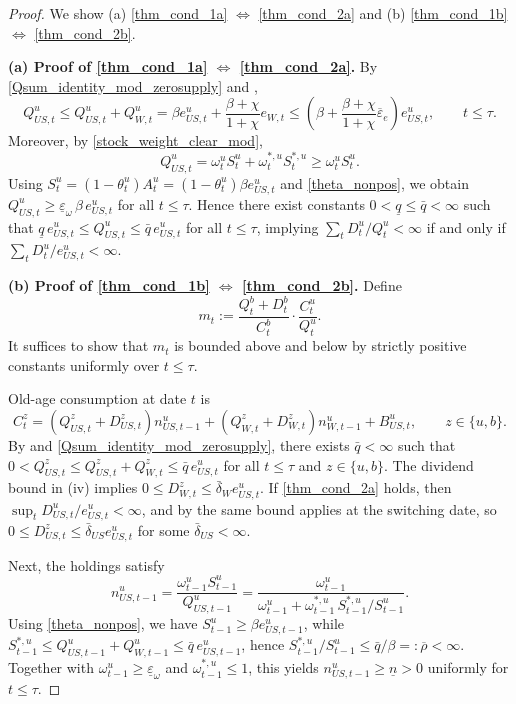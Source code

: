 \documentclass[12pt]{article}
\theoremstyle{plain}
\begin{document}
\begin{proof}
We show (a) \eqref{thm_cond_1a} $\Longleftrightarrow$ \eqref{thm_cond_2a} and (b) \eqref{thm_cond_1b}
$\Longleftrightarrow$ \eqref{thm_cond_2b}.

\medskip
\noindent\textbf{(a) Proof of \eqref{thm_cond_1a} $\Longleftrightarrow$ \eqref{thm_cond_2a}.}
By \eqref{Qsum_identity_mod_zerosupply} and ,
\[
Q_{US,t}^u \le Q_{US,t}^u+Q_{W,t}^u
=\beta e_{US,t}^u+\frac{\beta+\chi}{1+\chi}e_{W,t}
\le \left(\beta+\frac{\beta+\chi}{1+\chi}\overline\varepsilon_e\right)e_{US,t}^u,
\qquad t\le\tau.
\]
Moreover, by \eqref{stock_weight_clear_mod},
\[
Q_{US,t}^u=\omega_t^u S_t^u+\omega_t^{*,u}S_t^{*,u}\ge \omega_t^u S_t^u.
\]
Using $S_t^u=(1-\theta_t^u)A_t^u=(1-\theta_t^u)\beta e_{US,t}^u$ and \eqref{theta_nonpos}, we obtain
$Q_{US,t}^u\ge \underline\varepsilon_\omega\,\beta\,e_{US,t}^u$ for all $t\le\tau$.
Hence there exist constants $0<\underline q\le \bar q<\infty$ such that
$\underline q\,e_{US,t}^u\le Q_{US,t}^u\le \bar q\,e_{US,t}^u$ for all $t\le\tau$, implying
$\sum_t D_t^u/Q_t^u<\infty$ if and only if $\sum_t D_t^u/e_{US,t}^u<\infty$.

\medskip
\noindent\textbf{(b) Proof of \eqref{thm_cond_1b} $\Longleftrightarrow$ \eqref{thm_cond_2b}.}
Define
\[
m_t:=\frac{Q_t^b+D_t^b}{C_t^b}\cdot \frac{C_t^u}{Q_t^u}.
\]
It suffices to show that $m_t$ is bounded above and below by strictly positive constants uniformly over $t\le\tau$.

Old-age consumption at date $t$ is
\[
C_t^z
=
(Q_{US,t}^z+D_{US,t}^z)n_{US,t-1}^u
+(Q_{W,t}^z+D_{W,t}^z)n_{W,t-1}^u
+B_{US,t}^u,
\qquad z\in\{u,b\}.
\]
By  and \eqref{Qsum_identity_mod_zerosupply}, there exists $\bar q<\infty$ such that
$0<Q_{US,t}^z\le Q_{US,t}^z+Q_{W,t}^z\le \bar q\,e_{US,t}^u$ for all $t\le\tau$ and $z\in\{u,b\}$.
The dividend bound in (iv) implies $0\le D_{W,t}^z\le \bar\delta_W e_{US,t}^u$. If \eqref{thm_cond_2a} holds, then
$\sup_t D_{US,t}^u/e_{US,t}^u<\infty$, and by  the same bound applies at the switching date, so
$0\le D_{US,t}^z\le \bar\delta_{US}e_{US,t}^u$ for some $\bar\delta_{US}<\infty$.

Next, the holdings satisfy
\[
n_{US,t-1}^u
=\frac{\omega_{t-1}^u S_{t-1}^u}{Q_{US,t-1}^u}
=\frac{\omega_{t-1}^u}{\omega_{t-1}^u+\omega_{t-1}^{*,u}\,S_{t-1}^{*,u}/S_{t-1}^u}.
\]
Using \eqref{theta_nonpos}, we have $S_{t-1}^u\ge \beta e_{US,t-1}^u$, while
$S_{t-1}^{*,u}\le Q_{US,t-1}^u+Q_{W,t-1}^u\le \bar q\,e_{US,t-1}^u$, hence
$S_{t-1}^{*,u}/S_{t-1}^u\le \bar q/\beta =:\overline\rho<\infty$. Together with $\omega_{t-1}^u\ge \underline\varepsilon_\omega$
and $\omega_{t-1}^{*,u}\le 1$, this yields $n_{US,t-1}^u\ge \underline n>0$ uniformly for $t\le\tau$.


\end{proof}
\end{document}
